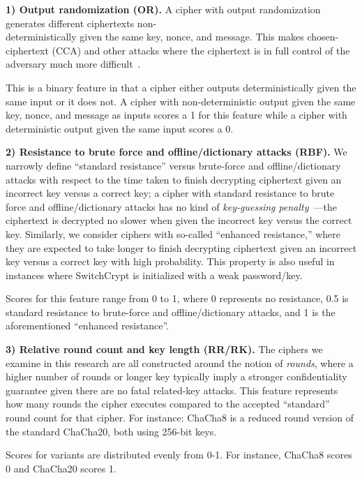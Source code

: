 \textbf{1) Output randomization (OR).} A cipher with output randomization
generates different ciphertexts non-\\deterministically given the same key,
nonce, and message. This makes chosen-ciphertext (CCA) and other attacks where
the ciphertext is in full control of the adversary much more
difficult~\cite{Freestyle}.

This is a binary feature in that a cipher either outputs deterministically given
the same input or it does not. A cipher with non-deterministic output given the
same key, nonce, and message as inputs scores a 1 for this feature while a
cipher with deterministic output given the same input scores a 0.

\textbf{2) Resistance to brute force and offline/dictionary attacks (RBF).} We
narrowly define ``standard resistance'' versus brute-force and
offline/dictionary attacks with respect to the time taken to finish decrypting
ciphertext given an incorrect key versus a correct key; a cipher with standard
resistance to brute force and offline/dictionary attacks has no kind of
\emph{key-guessing penalty}~\cite{Freestyle}---the ciphertext is decrypted no
slower when given the incorrect key versus the correct key. Similarly, we
consider ciphers with so-called ``enhanced resistance,'' where they are expected
to take longer to finish decrypting ciphertext given an incorrect key versus a
correct key with high probability. This property is also useful in instances
where SwitchCrypt is initialized with a weak password/key.

Scores for this feature range from 0 to 1, where 0 represents no resistance, 0.5
is standard resistance to brute-force and offline/dictionary attacks, and 1 is
the aforementioned ``enhanced resistance''.

\textbf{3) Relative round count and key length (RR/RK).} The ciphers we examine
in this research are all constructed around the notion of \emph{rounds}, where a
higher number of rounds or longer key typically imply a stronger confidentiality
guarantee given there are no fatal related-key attacks. This feature represents
how many rounds the cipher executes compared to the accepted ``standard'' round
count for that cipher. For instance: ChaCha8 is a reduced round version of the
standard ChaCha20, both using 256-bit keys.

Scores for variants are distributed evenly from 0-1. For instance, ChaCha8
scores 0 and ChaCha20 scores 1\@.

